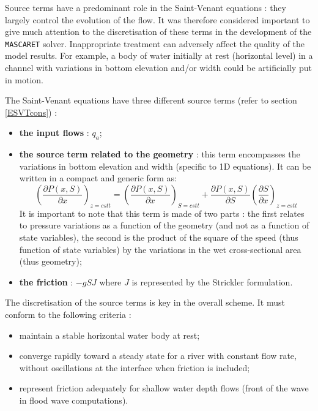 Source terms have a predominant role in the Saint-Venant equations : they largely control the evolution of the flow. It was therefore considered important to give much attention to the discretisation of these terms in the development of the \texttt{MASCARET} solver. Inappropriate treatment can adversely affect the quality of the model results. For example, a body of water initially at rest (horizontal level) in a channel with variations in bottom elevation and/or width could be artificially put in motion.

\vspace{0.5cm}

The Saint-Venant equations have three different source terms (refer to section \ref{ESVTcons}) :
\begin{itemize}
 \item \textbf{the input flows} : $q_a$;
 \item \textbf{the source term related to the geometry} : this term encompasses the variations in bottom elevation and width (specific to 1D equations). It can be written in a compact and generic form as:
   \begin{equation}
     \label{Decomp}
     \left ( \frac{\partial P(x,S)}{\partial x} \right )_{z=cstt} = \left ( \frac{\partial P(x,S)}{\partial x} \right )_{S=cstt} +  \frac{\partial P(x,S)}{\partial S}\left ( \frac{\partial S}{\partial x}\right )_{z=cstt}
   \end{equation}
   It is important to note that this term is made of two parts : the first relates to pressure variations as a function of the geometry (and not as a function of state variables), the second is the product of the square of the speed (thus function of state variables) by the variations in the wet cross-sectional area (thus geometry);
 \item \textbf{the friction} : $-g S J$ where $J$ is represented by the Strickler formulation.
\end{itemize}

\vspace{0.5cm}

The discretisation of the source terms is key in the overall scheme. It must conform to the following criteria :
\begin{itemize}
 \item maintain a stable horizontal water body at rest;
 \item converge rapidly toward a steady state for a river with constant flow rate, without oscillations at the interface when friction is included;
 \item represent friction adequately for shallow water depth flows (front of the wave in flood wave computations).
\end{itemize}

